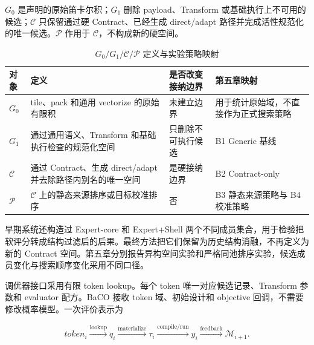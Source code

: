 $G_0$ 是声明的原始笛卡尔积；$G_1$ 删除 payload、Transform 或基础执行上不可用的候选；$\mathcal{C}$ 只保留通过硬 Contract、已经生成 direct/adapt 路径并完成活性规范化的唯一候选。$\mathcal{P}$ 作用于 $\mathcal{C}$，不构成新的硬空间。

\begin{table}[!htbp]
  \centering
  \caption{$G_0/G_1/\mathcal{C}/\mathcal{P}$ 定义与实验策略映射}
  \label{tab:chapter4-space-map}
  \begingroup
  \begin{tabularx}{\textwidth}{
    @{}
    >{\centering\arraybackslash}p{}
    >{\raggedright\arraybackslash}p{}
    >{\raggedright\arraybackslash}p{}
    >{\raggedright\arraybackslash}X
    @{}
  }
    \toprule
    \textbf{对象} & \textbf{定义} & \textbf{是否改变接纳边界} &
    \textbf{第五章映射} \\
    \midrule
    $G_0$ &
    tile、pack 和通用 vectorize 的原始有限积 &
    未建立边界 &
    用于统计原始域，不直接作为正式搜索策略 \\
    $G_1$ &
    通过通用语义、Transform 和基础执行检查的规范化空间 &
    只删除不可执行候选 &
    B1 Generic 基线 \\
    $\mathcal{C}$ &
    通过 Contract、生成 direct/adapt 并去除路径内别名的唯一空间 &
    是硬接纳边界 &
    B2 Contract-only \\
    $\mathcal{P}$ &
    $\mathcal{C}$ 上的静态来源排序或目标校准排序 &
    否 &
    B3 静态来源策略与 B4 校准策略 \\
    \bottomrule
  \end{tabularx}
  \endgroup
\end{table}

早期系统还构造过 Expert-core 和 Expert+Shell 两个不同成员集合，用于检验把软评分转成结构过滤后的后果。最终方法把它们保留为历史结构消融，不再定义为新的 Contract 空间。第五章分别报告异构空间实验和严格同池排序实验，候选成员变化与搜索顺序变化采用不同口径。

调优器接口采用有限 token lookup。每个 token 唯一对应候选记录、Transform 参数和 evaluator 配方。BaCO 接收 token 域、初始设计和 objective 回调，不需要修改概率模型\cite{Hellsten2023BaCO}。一次评价表示为

\begin{equation}
token_i
\xrightarrow{\mathrm{lookup}}q_i
\xrightarrow{\mathrm{materialize}}\tau_i
\xrightarrow{\mathrm{compile/run}}y_i
\xrightarrow{\mathrm{feedback}}\mathcal{M}_{i+1}.
\label{eq:chapter4-tuner-loop}
\end{equation}

